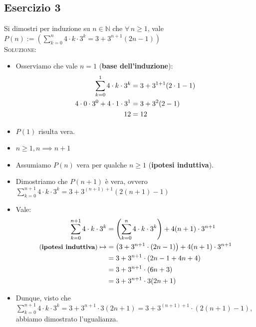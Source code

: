 \documentclass[10pt]{article}
\begin{document}
  \subsection{Esercizio 3}
	Si dimostri per induzione su $n \!\in\! \mathbb{N}$ che $\forall \, n \geq 1$, vale $P(n) := \displaystyle{\left(\sum_{k=0}^n 4 \cdot k \cdot 3^k = 3 + 3^{n+1} (2n-1) \right)}$
	\\ \textsc{Soluzione:}
	\begin{itemize}
	\item
	Osserviamo che vale $n=1$ (\textbf{base dell'induzione}):
	\begin{equation}
	\begin{split}
	\sum_{k=0}^1 4 \cdot k \cdot 3^k &= 3 + 3^{1+1} (2 \cdot 1 -1) \\
	4 \cdot 0 \cdot 3^0 + 4 \cdot 1 \cdot 3^1 &= 3+3^2(2-1) \\
	12 &= 12
	\notag
	\end{split}
	\end{equation}
	\item
	$P(1)$ risulta vera.
	\item
	$n \!\geq\! 1, n \implies n+1$
	\item
	Assumiamo $P(n)$ vera per qualche $n \!\geq\! 1$ (\textbf{ipotesi induttiva}).
	\item
	Dimostriamo che $P(n+1)$ è vera, ovvero $\displaystyle{\sum_{k=0}^{n+1} 4 \cdot k \cdot 3^k = 3 + 3^{(n+1)+1} (2(n+1)-1)}$
	\item
	Vale:
	\begin{equation}
	\begin{split}
	\sum_{k=0}^{n+1} 4 \cdot k \cdot 3^k &= \left(\sum_{k=0}^{n} 4 \cdot k \cdot 3^k \right) + 4(n+1) \cdot 3^{n+1} \\
	\textrm{\small{(\textbf{ipotesi induttiva})}} \mapsto &= \left( 3 + 3^{n+1}\cdot(2n -1)\right) + 4(n+1) \cdot 3^{n+1} \\
	&= 3 + 3^{n+1}\cdot(2n -1 + 4n +4) \\
	&= 3 + 3^{n+1}\cdot(6n +3) \\
	&= 3 + 3^{n+1} \cdot 3(2n+1)
	\notag
	\end{split}
	\end{equation}
	\item
	Dunque, visto che $\displaystyle{\sum_{k=0}^{n+1} 4 \cdot k \cdot 3^k = 3 + 3^{n+1}\cdot 3(2n+1) = 3 + 3^{(n+1)+1} \cdot (2(n+1)-1)}$, abbiamo dimostrato l'ugualianza.
	\end{itemize}
	
\end{document}

